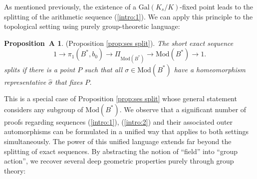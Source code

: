 \documentclass[10pt]{amsart}
\theoremstyle{definition}
\newtheorem*{propA}{Proposition~A}
\newcommand{\Gal}{{ \mathrm{Gal}}}
\begin{document}
As mentioned previously, the existence of a $\Gal(K_s/K)$-fixed point leads to the splitting of the arithmetic sequence (\ref{intro:1}). We can apply this principle to the topological setting using purely group-theoretic language:

\begin{propA}(Proposition \ref{prop:ses split}).
\textit{The short exact sequence
\[
1\rightarrow \pi_1(B^*,b_0) \rightarrow \Pi_{\mathrm{Mod}(B^*)} \rightarrow \mathrm{Mod}(B^*)\rightarrow 1.
\]
splits if there is a point $P$ such that all $\sigma \in \mathrm{Mod}(B^*)$ have a homeomorphism representative $\hat{\sigma}$ that fixes $P$.
}
\end{propA}

This is a special case of Proposition \ref{prop:ses split} whose general statement considers any subgroup of $\mathrm{Mod}(B^*)$.
We observe that a significant number of proofs regarding sequences (\ref{intro:1}), (\ref{intro:2}) and their associated outer automorphisms can be formulated in a unified way that applies to both settings simultaneously.
The power of this unified language extends far beyond the splitting of exact sequences. By abstracting the notion of ``field'' into ``group action'', we recover several deep geometric properties purely through group theory:
\end{document}
